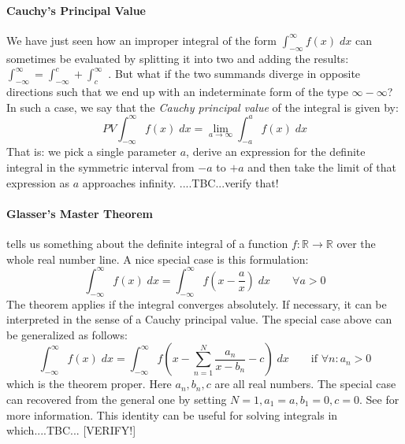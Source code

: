 


\paragraph{Cauchy's Principal Value}
We have just seen how an improper integral of the form $\int_{-\infty}^{\infty} f(x) \; dx$ can sometimes be evaluated by splitting it into two and adding the results:  $\int_{-\infty}^{\infty} = \int_{-\infty}^c + \int_c^{\infty}$ . But what if the two summands diverge in opposite directions such that we end up with an indeterminate form of the type $\infty - \infty$? In such a case, we say that the \emph{Cauchy principal value} of the integral is given by:
\begin{equation}
PV \int_{-\infty}^{\infty} f(x) \; dx = \lim_{a \rightarrow \infty} \int_{-a}^a f(x) \; dx
\end{equation}
That is: we pick a single parameter $a$, derive an expression for the definite integral in the symmetric interval from $-a$ to $+a$ and then take the limit of that expression as $a$ approaches infinity. ....TBC...verify that!



\paragraph{Glasser's Master Theorem} tells us something about the definite integral of a function $f: \mathbb{R} \rightarrow \mathbb{R}$ over the whole real number line. A nice special case is this formulation:
\begin{equation}
 \int_{-\infty}^{\infty} f(x) \; dx  = 
 \int_{-\infty}^{\infty} f(x - \frac{a}{x}) \; dx 
 \qquad \forall a > 0
\end{equation}
The theorem applies if the integral converges absolutely. If necessary, it can be interpreted in the sense of a Cauchy principal value. The special case above can be generalized as follows:
\begin{equation}
 \int_{-\infty}^{\infty} f(x) \; dx  = 
 \int_{-\infty}^{\infty} f \left( x - \sum_{n=1}^N \frac{a_n}{x - b_n} - c \right) \; dx 
 \qquad \text{if } \forall n: a_n > 0
\end{equation}
which is the theorem proper. Here $a_n, b_n, c$ are all real numbers. The special case can recovered from the general one by setting $N=1, a_1=a, b_1=0, c=0$. See \cite{WK_GlasserMaster} for more information. This identity can be useful for solving integrals in which....TBC...
[VERIFY!]



